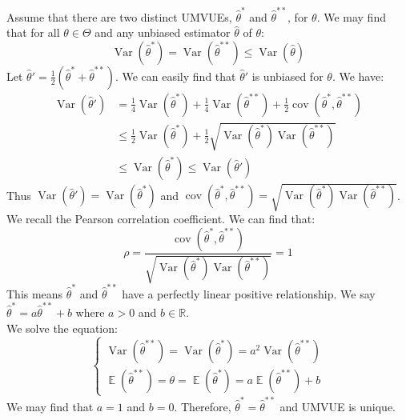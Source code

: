\documentclass{huhtakm-template-book-v2}
\DeclareMathOperator{\E}{\mathbb{E}}
\DeclareMathOperator{\Var}{Var}
\DeclareMathOperator{\cov}{cov}
\begin{document}
\begin{proofing}
	Assume that there are two distinct UMVUEs, $\hat{\theta}^{*}$ and $\hat{\theta}^{**}$, for $\theta$. We may find that for all $\theta\in\Theta$ and any unbiased estimator $\hat{\theta}$ of $\theta$:
	\begin{equation*}
		\Var(\hat{\theta}^{*})=\Var(\hat{\theta}^{**})\leq\Var(\hat{\theta})
	\end{equation*}
	Let $\hat{\theta}'=\frac{1}{2}(\hat{\theta}^{*}+\hat{\theta}^{**})$. We can easily find that $\hat{\theta}'$ is unbiased for $\theta$. We have:
	\begin{align*}
		\Var(\hat{\theta}')&=\frac{1}{4}\Var(\hat{\theta}^{*})+\frac{1}{4}\Var(\hat{\theta}^{**})+\frac{1}{2}\cov(\hat{\theta}^{*},\hat{\theta}^{**})\\
		&\leq\frac{1}{2}\Var(\hat{\theta}^{*})+\frac{1}{2}\sqrt{\Var(\hat{\theta}^{*})\Var(\hat{\theta}^{**})}\\
		&\leq\Var(\hat{\theta}^{*})\leq\Var(\hat{\theta}')
	\end{align*}
	Thus $\Var(\hat{\theta}')=\Var(\hat{\theta}^{*})$ and $\cov(\hat{\theta}^{*},\hat{\theta}^{**})=\sqrt{\Var(\hat{\theta}^{*})\Var(\hat{\theta}^{**})}$.\\
	We recall the Pearson correlation coefficient. We can find that:
	\begin{equation*}
		\rho=\frac{\cov(\hat{\theta}^{*},\hat{\theta}^{**})}{\sqrt{\Var(\hat{\theta}^{*})\Var(\hat{\theta}^{**})}}=1
	\end{equation*}
	This means $\hat{\theta}^{*}$ and $\hat{\theta}^{**}$ have a perfectly linear positive relationship. We say $\hat{\theta}^{*}=a\hat{\theta}^{**}+b$ where $a>0$ and $b\in\mathbb{R}$.\\
	We solve the equation:
	\begin{equation*}
		\begin{cases}
			\Var(\hat{\theta}^{**})=\Var(\hat{\theta}^{*})=a^{2}\Var(\hat{\theta}^{**})\\
			\E(\hat{\theta}^{**})=\theta=\E(\hat{\theta}^{*})=a\E(\hat{\theta}^{**})+b
		\end{cases}
	\end{equation*}
	We may find that $a=1$ and $b=0$. Therefore, $\hat{\theta}^{*}=\hat{\theta}^{**}$ and UMVUE is unique.
\end{proofing}
\end{document}
